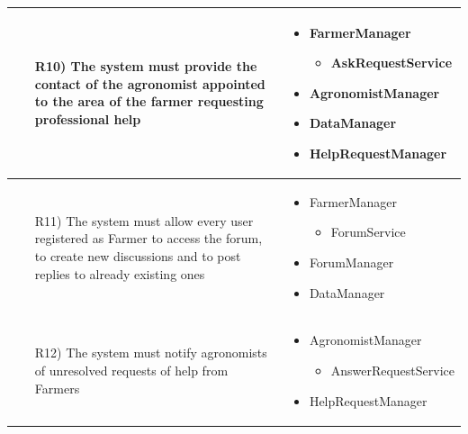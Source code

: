 \documentclass[table, 12pt]{article}
\begin{document}
\begin{longtable}{|p{}|p{}|}
    \begin{itemize}
        \item[R10)] The system must provide the contact of the agronomist appointed to the area of the farmer requesting professional help
    \end{itemize}
    &
    \begin{itemize}
        \item FarmerManager
        \begin{itemize}
            \item AskRequestService
        \end{itemize}
        \item AgronomistManager
        \item DataManager
        \item HelpRequestManager
    \end{itemize}
    \\\hline

    \begin{itemize}
        \item[R11)] The system must allow every user registered as Farmer to access the forum, to create new discussions and to post replies to already existing ones
    \end{itemize}
    &
    \begin{itemize}
        \item FarmerManager
        \begin{itemize}
            \item ForumService
        \end{itemize}
        \item ForumManager
        \item DataManager
    \end{itemize}
    \\\hline

    \begin{itemize}
        \item[R12)] The system must notify agronomists of unresolved requests of help from Farmers 
    \end{itemize}
    &
    \begin{itemize}
        \item AgronomistManager
        \begin{itemize}
            \item AnswerRequestService
        \end{itemize}
        \item HelpRequestManager
    \end{itemize}
    \\\hline


\end{longtable}
\end{document}
